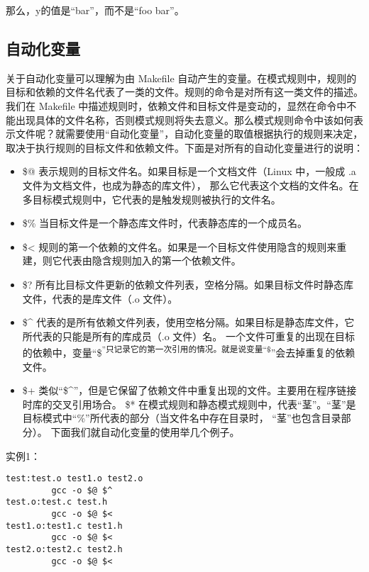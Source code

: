 \documentclass[]{book}
\providecommand{\tightlist}{%
  \setlength{\itemsep}{0pt}\setlength{\parskip}{0pt}}
\begin{document}
那么，y的值是``bar''，而不是``foo bar''。

\hypertarget{ux81eaux52a8ux5316ux53d8ux91cf}{%
\subsection{自动化变量}\label{ux81eaux52a8ux5316ux53d8ux91cf}}

关于自动化变量可以理解为由 Makefile 自动产生的变量。在模式规则中，规则的目标和依赖的文件名代表了一类的文件。规则的命令是对所有这一类文件的描述。我们在 Makefile 中描述规则时，依赖文件和目标文件是变动的，显然在命令中不能出现具体的文件名称，否则模式规则将失去意义。那么模式规则命令中该如何表示文件呢？就需要使用``自动化变量''，自动化变量的取值根据执行的规则来决定，取决于执行规则的目标文件和依赖文件。下面是对所有的自动化变量进行的说明：

\begin{itemize}
\tightlist
\item
  \$@ 表示规则的目标文件名。如果目标是一个文档文件（Linux 中，一般成 .a 文件为文档文件，也成为静态的库文件），
  那么它代表这个文档的文件名。在多目标模式规则中，它代表的是触发规则被执行的文件名。
\item
  \$\% 当目标文件是一个静态库文件时，代表静态库的一个成员名。
\item
  \$\textless{} 规则的第一个依赖的文件名。如果是一个目标文件使用隐含的规则来重建，则它代表由隐含规则加入的第一个依赖文件。
\item
  \$? 所有比目标文件更新的依赖文件列表，空格分隔。如果目标文件时静态库文件，代表的是库文件（.o 文件）。
\item
  \$\^{} 代表的是所有依赖文件列表，使用空格分隔。如果目标是静态库文件，它所代表的只能是所有的库成员（.o 文件）名。
  一个文件可重复的出现在目标的依赖中，变量``\$\textsuperscript{''只记录它的第一次引用的情况。就是说变量``\$}''会去掉重复的依赖文件。
\item
  \$+ 类似``\$\^{}''，但是它保留了依赖文件中重复出现的文件。主要用在程序链接时库的交叉引用场合。
  \$*\textbar{} 在模式规则和静态模式规则中，代表``茎''。``茎''是目标模式中``\%''所代表的部分（当文件名中存在目录时，
  ``茎''也包含目录部分）。
  下面我们就自动化变量的使用举几个例子。
\end{itemize}

实例1：

\begin{verbatim}
test:test.o test1.o test2.o
         gcc -o $@ $^
test.o:test.c test.h
         gcc -o $@ $<
test1.o:test1.c test1.h
         gcc -o $@ $<
test2.o:test2.c test2.h
         gcc -o $@ $<
\end{verbatim}
\end{document}
